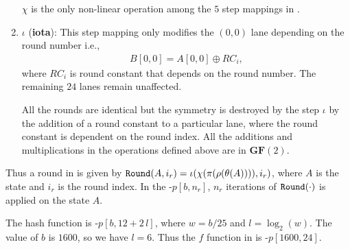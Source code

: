 \begin{enumerate}
    $\chi$ is the only non-linear operation among the $5$ step mappings in \KECCAK{}.
    
    \vskip5pt
    \item $\iota$ ({\bf iota}): This step mapping only modifies the $(0, 0)$ lane depending on the round number i.e., 
    \begin{align}
       B[0, 0] = A[0, 0] \oplus RC_i,
   \end{align}
    where $RC_i$ is round constant that depends on the round number. The remaining $24$ lanes remain unaffected.
    
    All the rounds are identical but the symmetry is destroyed by the step $\iota$ by the addition of a round constant to a particular lane, where the round constant is dependent on the round index.
    All the additions and multiplications in the operations defined above are in $\textbf{GF}(2)$.
\end{enumerate}
Thus a round in \Keccak{} is given by ${\tt Round}(A, i_r) = \iota( \chi( \pi ( \rho ( \theta ( A ) ) ) ) , i_r)$, where $A$ is the state and $i_r$ is the round index. In the \Keccak-$p[b, n_r]$, $n_r$ iterations of ${\tt Round}(\cdot)$ is applied on the state $A$.

The  hash function is \Keccak-$p[b, 12 + 2\,l]$, where $w = b/25$ and $l = \log_{2}(w)$. The value of $b$ is $1600$, so we have $l = 6$. Thus the $f$ function in  is \Keccak-$p[1600, 24]$.

